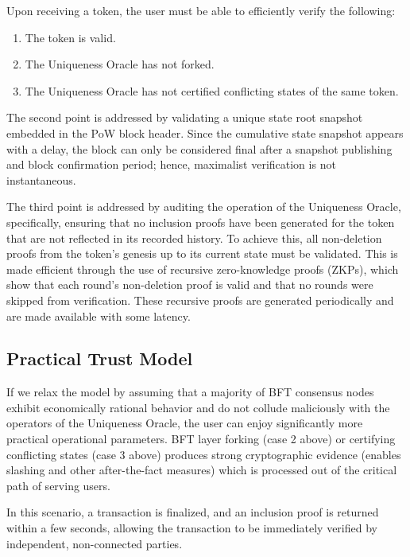 \documentclass{article}
\begin{document}
Upon receiving a token, the user must be able to efficiently verify the following:

\begin{enumerate}
    \item The token is valid.

    \item The Uniqueness Oracle has not forked.

    \item The Uniqueness Oracle has not certified conflicting states of the same token.
\end{enumerate}

The second point is addressed by validating a unique state root snapshot embedded in the PoW block header. Since the cumulative state snapshot appears with a delay, the block can only be considered final after a snapshot publishing and block confirmation period; hence, maximalist verification is not instantaneous.

The third point is addressed by auditing the operation of the Uniqueness Oracle, specifically, ensuring that no inclusion proofs have been generated for the token that are not reflected in its recorded history. To achieve this, all non-deletion proofs from the token's genesis up to its current state must be validated. This is made efficient through the use of recursive zero-knowledge proofs (ZKPs), which show that each round's non-deletion proof is valid and that no rounds were skipped from verification. These recursive proofs are generated periodically and are made available with some latency.

\subsection{Practical Trust Model}

If we relax the model by assuming that a majority of BFT consensus nodes exhibit economically rational behavior and do not collude maliciously with the operators of the Uniqueness Oracle, the user can enjoy significantly more practical operational parameters. BFT layer forking (case 2 above) or certifying conflicting states (case 3 above) produces strong cryptographic evidence (enables slashing and other after-the-fact measures) which is processed out of the critical path of serving users.

In this scenario, a transaction is finalized, and an inclusion proof is returned within a few seconds, allowing the transaction to be immediately verified by independent, non-connected parties.
\end{document}
